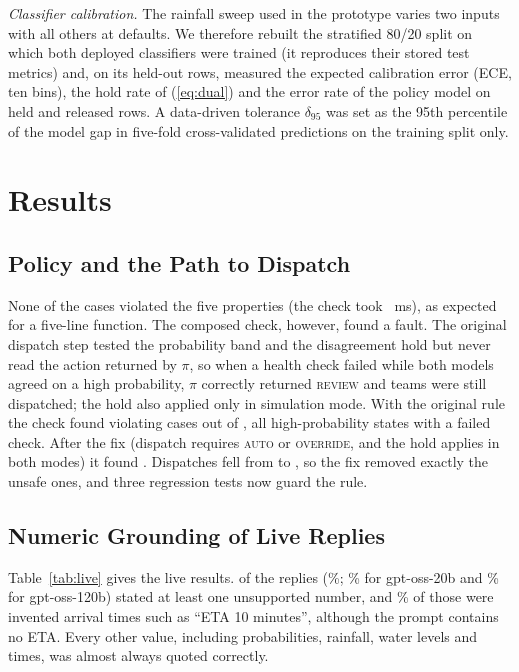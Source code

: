 \documentclass[conference]{IEEEtran}
\begin{document}
\textit{Classifier calibration.} The rainfall sweep used in the prototype varies two inputs with all others at defaults. We therefore rebuilt the stratified 80/20 split on which both deployed classifiers were trained (it reproduces their stored test metrics) and, on its \CalTest{} held-out rows, measured the expected calibration error (ECE, ten bins), the hold rate of (\ref{eq:dual}) and the error rate of the policy model on held and released rows. A data-driven tolerance $\delta_{95}$ was set as the 95th percentile of the model gap in five-fold cross-validated predictions on the training split only.

\section{Results}
\subsection{Policy and the Path to Dispatch}
\label{sec:audit}
None of the \PolCases{} cases violated the five properties (the check took \PolMs~ms), as expected for a five-line function. The composed check, however, found a fault. The original dispatch step tested the probability band and the disagreement hold but never read the action returned by $\pi$, so when a health check failed while both models agreed on a high probability, $\pi$ correctly returned \textsc{review} and teams were still dispatched; the hold also applied only in simulation mode. With the original rule the check found \EtoEViolBefore{} violating cases out of \EtoECases, all high-probability states with a failed check. After the fix (dispatch requires \textsc{auto} or \textsc{override}, and the hold applies in both modes) it found \EtoEViolAfter. Dispatches fell from \EtoEFiredBefore{} to \EtoEFiredAfter, so the fix removed exactly the unsafe ones, and three regression tests now guard the rule.

\subsection{Numeric Grounding of Live Replies}
Table~\ref{tab:live} gives the live results. \LiveUnsup{} of the \LiveN{} replies (\LiveUnsupPct\%; \LiveTwentyUnsupPct\% for gpt-oss-20b and \LiveOneTwentyUnsupPct\% for gpt-oss-120b) stated at least one unsupported number, and \LiveEtaPct\% of those were invented arrival times such as ``ETA 10 minutes'', although the prompt contains no ETA. Every other value, including probabilities, rainfall, water levels and times, was almost always quoted correctly.
\end{document}
